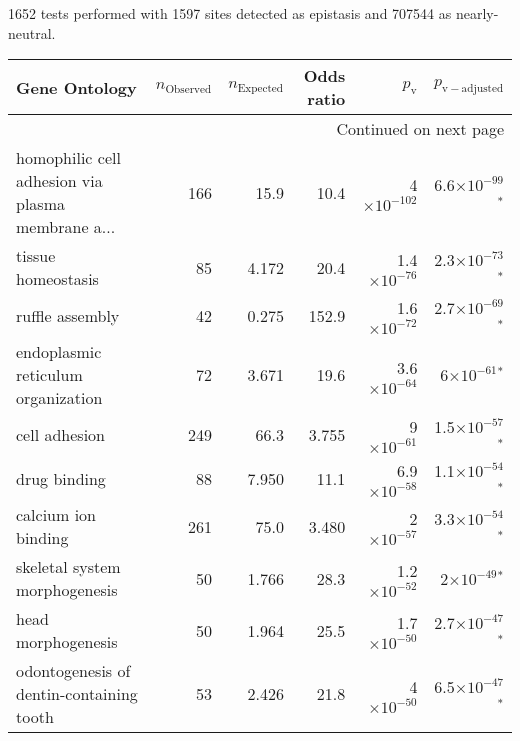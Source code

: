 1652 tests performed with 1597 sites detected as epistasis and 707544 as nearly-neutral.
\scriptsize
\begin{longtable}{|l|r|r|r|r|r|}
\toprule
                                     Gene Ontology & $n_{\mathrm{Observed}}$ & $n_{\mathrm{Expected}}$ & Odds ratio &     $p_{\mathrm{v}}$ &      $p_{\mathrm{v-adjusted}}$ \\
\midrule
\endhead
\midrule
\multicolumn{6}{r}{{Continued on next page}} \\
\midrule
\endfoot

\bottomrule
\endlastfoot
 homophilic cell adhesion via plasma membrane a... &                     166 &                    15.9 &       10.4 &  4$\times 10^{-102}$ &  6.6$\times 10^{-99}$$\bm{^*}$ \\
                                tissue homeostasis &                      85 &                   4.172 &       20.4 & 1.4$\times 10^{-76}$ &  2.3$\times 10^{-73}$$\bm{^*}$ \\
                                   ruffle assembly &                      42 &                   0.275 &      152.9 & 1.6$\times 10^{-72}$ &  2.7$\times 10^{-69}$$\bm{^*}$ \\
                endoplasmic reticulum organization &                      72 &                   3.671 &       19.6 & 3.6$\times 10^{-64}$ &    6$\times 10^{-61}$$\bm{^*}$ \\
                                     cell adhesion &                     249 &                    66.3 &      3.755 &   9$\times 10^{-61}$ &  1.5$\times 10^{-57}$$\bm{^*}$ \\
                                      drug binding &                      88 &                   7.950 &       11.1 & 6.9$\times 10^{-58}$ &  1.1$\times 10^{-54}$$\bm{^*}$ \\
                               calcium ion binding &                     261 &                    75.0 &      3.480 &   2$\times 10^{-57}$ &  3.3$\times 10^{-54}$$\bm{^*}$ \\
                     skeletal system morphogenesis &                      50 &                   1.766 &       28.3 & 1.2$\times 10^{-52}$ &    2$\times 10^{-49}$$\bm{^*}$ \\
                                head morphogenesis &                      50 &                   1.964 &       25.5 & 1.7$\times 10^{-50}$ &  2.7$\times 10^{-47}$$\bm{^*}$ \\
          odontogenesis of dentin-containing tooth &                      53 &                   2.426 &       21.8 &   4$\times 10^{-50}$ &  6.5$\times 10^{-47}$$\bm{^*}$ \\

\end{longtable}
